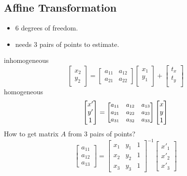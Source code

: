 \subsection{Affine Transformation}
\begin{itemize}
  \item $6$ degrees of freedom.
  \item needs $3$ pairs of points to estimate.
\end{itemize}
inhomogeneous
\[\begin{bmatrix}
  x_2\\
  y_2
\end{bmatrix}=
\begin{bmatrix}
  a_{11} & a_{12}\\
  a_{21} & a_{22}
\end{bmatrix}
\begin{bmatrix}
  x_1\\
  y_1\\
\end{bmatrix}+
\begin{bmatrix}
  t_x\\
  t_y\\
\end{bmatrix}
\]
homogeneous
\[\begin{bmatrix}
  x'\\
  y'\\
  1
\end{bmatrix}=
{\small
\begin{bmatrix}
  a_{11} & a_{12} & a_{13}\\
  a_{21} & a_{22} & a_{23}\\
  a_{31} & a_{32} & a_{33}
\end{bmatrix}
}
\begin{bmatrix}
  x\\
  y\\
  1
\end{bmatrix}
\]
How to get matrix $A$ from 3 pairs of points?
\[
  \begin{bmatrix}
    a_{11}\\
    a_{12}\\
    a_{13}
  \end{bmatrix} =
  \begin{bmatrix}
    x_1 & y_1 & 1\\
    x_2 & y_2 & 1\\
    x_3 & y_3 & 1
  \end{bmatrix}^{-1}
  \begin{bmatrix}
    x'_1\\
    x'_2\\
    x'_3
  \end{bmatrix}
\]

